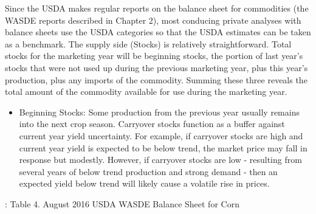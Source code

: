 \documentclass[]{book}
\providecommand{\tightlist}{%
  \setlength{\itemsep}{0pt}\setlength{\parskip}{0pt}}
\theoremstyle{definition}
\theoremstyle{definition}
\theoremstyle{remark}
\begin{document}
Since the USDA makes regular reports on the balance sheet for
commodities (the WASDE reports described in Chapter 2), most conducing
private analyses with balance sheets use the USDA categories so that the
USDA estimates can be taken as a benchmark. The supply side (Stocks) is
relatively straightforward. Total stocks for the marketing year will be
beginning stocks, the portion of last year's stocks that were not used
up during the previous marketing year, plus this year's production, plus
any imports of the commodity. Summing these three reveals the total
amount of the commodity available for use during the marketing year.

\begin{itemize}
\tightlist
\item
  Beginning Stocks: Some production from the previous year usually
  remains into the next crop season. Carryover stocks function as a
  buffer against current year yield uncertainty. For example, if
  carryover stocks are high and current year yield is expected to be
  below trend, the market price may fall in response but modestly.
  However, if carryover stocks are low - resulting from several years of
  below trend production and strong demand - then an expected yield
  below trend will likely cause a volatile rise in prices.
\end{itemize}

: Table 4. August 2016 USDA WASDE Balance Sheet for Corn
\end{document}
